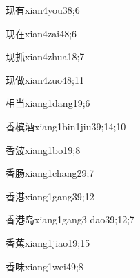 \begin{verbete}{现有}{xian4you3}{8;6}
\end{verbete}

\begin{verbete}{现在}{xian4zai4}{8;6}
\end{verbete}

\begin{verbete}{现抓}{xian4zhua1}{8;7}
\end{verbete}

\begin{verbete}{现做}{xian4zuo4}{8;11}
\end{verbete}

\begin{verbete}{相当}{xiang1dang1}{9;6}
\end{verbete}

\begin{verbete}{香槟酒}{xiang1bin1jiu3}{9;14;10}
\end{verbete}

\begin{verbete}{香波}{xiang1bo1}{9;8}
\end{verbete}

\begin{verbete}{香肠}{xiang1chang2}{9;7}
\end{verbete}

\begin{verbete}{香港}{xiang1gang3}{9;12}
\end{verbete}

\begin{verbete}{香港岛}{xiang1gang3 dao3}{9;12;7}
\end{verbete}

\begin{verbete}{香蕉}{xiang1jiao1}{9;15}
\end{verbete}

\begin{verbete}{香味}{xiang1wei4}{9;8}
\end{verbete}

